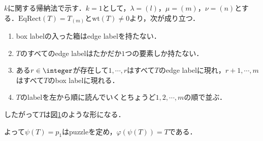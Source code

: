 $k$に関する帰納法で示す．$k=1$として，$\lambda=(l)$，$\mu=(m)$，$\nu=(n)$とする．$\text{EqRect}(T)=T_{(m)}$と$\text{wt}(T)\neq 0$より，次が成り立つ．
  \begin{enumerate}
    \item box labelの入った箱はedge labelを持たない．
    \item $T$のすべてのedge labelはたかだか$1$つの要素しか持たない．
    \item ある$r\in\integer$が存在して$1,\cdots,r$はすべて$T$のedge labelに現れ，$r+1,\cdots,m$はすべて$T$のbox labelに現れる．
    \item $T$のlabelを左から順に読んでいくとちょうど$1,2,\cdots,m$の順で並ぶ．
  \end{enumerate}
  
  したがって$T$は図\ref{1 row tableaux}のような形になる．
  \begin{figure}[h]
    \centering
    \caption{}\label{1 row tableaux}
  \end{figure}
  よって$\psi(T)=p_1$はpuzzleを定め，$\varphi(\psi(T))=T$である．
